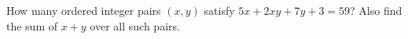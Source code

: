 How many ordered integer pairs $(x,y)$ satisfy $5x+2xy+7y+3=59$? Also find the sum of $x+y$ over all such pairs.
